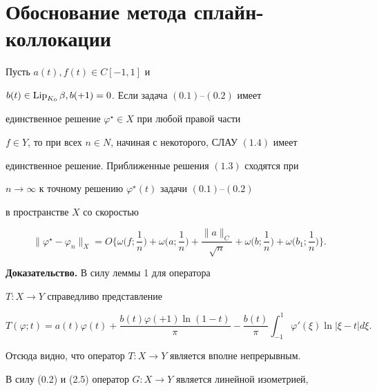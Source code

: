 \section{Обоснование метода сплайн-коллокации}





\begin{thm}


Пусть $a(t),f(t)\in C[-1,1]$ и 


$b(t)\in \operatorname{Lip}_{K_0}\beta,b(+1)=0$. Если задача $(0.1)$--$(0.2)$ имеет


единственное решение $\varphi^{\star}\in X$ при любой правой части


$f\in Y$, то при всех $n\in N$, начиная с некоторого, СЛАУ $(1.4)$ имеет


единственное решение. Приближенные решения $(1.3)$ сходятся при 


$n\to\infty$ к точному решению $\varphi^{\star}(t)$ задачи $(0.1)$--$(0.2)$


в пространстве $X$ со скоростью


\begin{equation}


\|\varphi^{\star}-\varphi_n\|_X=O\bigg\{\omega\bigg(f;\frac{1}{n}\bigg)+


\omega\bigg(a;\frac{1}{n}\bigg)+


\frac{\| a\|_C}{\sqrt n}+\omega\bigg(b;\frac


{1}{n}\bigg)+\omega\bigg(b_1;\frac{1}{n}\bigg)\bigg\}.


\end{equation}


\end{thm}





{\bf Доказательство.} В силу леммы 1 для оператора 


$T:X\to Y$ справедливо представление


\begin{equation}


T(\varphi;t)=a(t)\varphi(t)+\frac{b(t)\varphi(+1)\ln(1-t)}{\pi}-\frac


{b(t)}{\pi}\int_{-1}^1\varphi'(\xi)\ln|\xi-t|d\xi.


\end{equation}


Отсюда видно, что оператор $T:X\to Y$ является вполне непрерывным. 


В силу (0.2) и (2.5) оператор $G:X\to Y$ является линейной изометрией,


